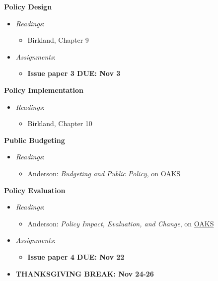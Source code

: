 \week \textbf{Policy Design}

\begin{itemize}

\item
  \emph{Readings}:

  \begin{itemize}
  
  \item
    Birkland, Chapter 9
  \end{itemize}
\item
  \emph{Assignments}:

  \begin{itemize}
  
  \item
    \textbf{Issue paper 3 DUE: Nov 3}
  \end{itemize}
\end{itemize}

\week \textbf{Policy Implementation}

\begin{itemize}

\item
  \emph{Readings}:

  \begin{itemize}
  
  \item
    Birkland, Chapter 10
  \end{itemize}
\end{itemize}

\week \textbf{Public Budgeting}

\begin{itemize}

\item
  \emph{Readings}:

  \begin{itemize}
  
  \item
    Anderson: \emph{Budgeting and Public Policy}, on
    \href{https://lms.cofc.edu/d2l/login}{OAKS}
  \end{itemize}
\end{itemize}

\week \textbf{Policy Evaluation}

\begin{itemize}

\item
  \emph{Readings}:

  \begin{itemize}
  
  \item
    Anderson: \emph{Policy Impact, Evaluation, and Change}, on
    \href{https://lms.cofc.edu/d2l/login}{OAKS}
  \end{itemize}
\item
  \emph{Assignments}:

  \begin{itemize}
  
  \item
    \textbf{Issue paper 4 DUE: Nov 22}
  \end{itemize}
\item
  \textbf{THANKSGIVING BREAK: Nov 24-26}
\end{itemize}

